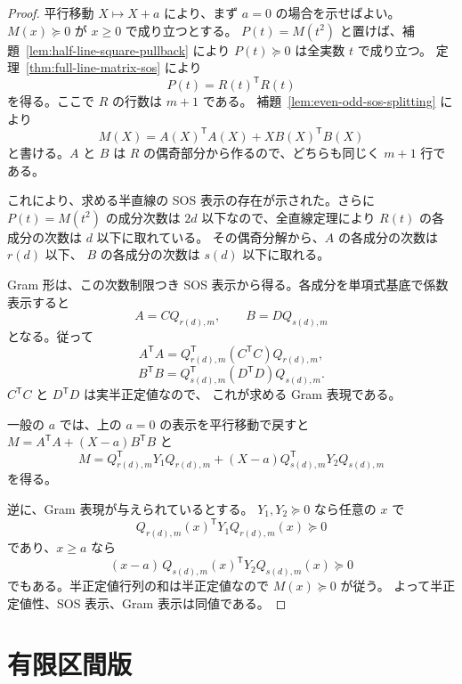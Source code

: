 \documentclass[uplatex,dvipdfmx]{jsarticle}
\newcommand{\psd}{\succeq 0}
\newcommand{\restateprefix}{}
\theoremstyle{matrixsosdefinition}
\begin{document}
\begin{proof}
  平行移動 \(X\mapsto X+a\) により、まず \(a=0\) の場合を示せばよい。
  \(M(x)\psd\) が \(x\ge0\) で成り立つとする。
  \(P(t)=M(t^2)\) と置けば、補題~\ref{lem:half-line-square-pullback} により
  \(P(t)\psd\) は全実数 \(t\) で成り立つ。
  定理~\ref{thm:full-line-matrix-sos} により
    \[
      P(t)=R(t)^{\mathsf T}R(t)
    \]
    を得る。ここで \(R\) の行数は \(m+1\) である。
    補題~\ref{lem:even-odd-sos-splitting} により
    \[
      M(X)=A(X)^{\mathsf T}A(X)+X B(X)^{\mathsf T}B(X)
    \]
    と書ける。\(A\) と \(B\) は \(R\) の偶奇部分から作るので、どちらも同じく
    \(m+1\) 行である。

  これにより、求める半直線の SOS 表示の存在が示された。さらに \(P(t)=M(t^2)\) の成分次数は
  \(2d\) 以下なので、全直線定理により \(R(t)\) の各成分の次数は \(d\) 以下に取れている。
  その偶奇分解から、\(A\) の各成分の次数は \(r(d)\) 以下、
  \(B\) の各成分の次数は \(s(d)\) 以下に取れる。

  Gram 形は、この次数制限つき SOS 表示から得る。各成分を単項式基底で係数表示すると
  \[
    A=CQ_{r(d),m},\qquad B=DQ_{s(d),m}
  \]
  となる。従って
  \[
    A^{\mathsf T}A
    =
    Q_{r(d),m}^{\mathsf T}(C^{\mathsf T}C)Q_{r(d),m},
  \]
  \[
    B^{\mathsf T}B
    =
    Q_{s(d),m}^{\mathsf T}(D^{\mathsf T}D)Q_{s(d),m}.
    \]
    \(C^{\mathsf T}C\) と \(D^{\mathsf T}D\) は実半正定値なので、
    これが求める Gram 表現である。

  一般の \(a\) では、上の \(a=0\) の表示を平行移動で戻すと
  \(M=A^{\mathsf T}A+(X-a)B^{\mathsf T}B\) と
  \[
    M=
    Q_{r(d),m}^{\mathsf T}Y_1Q_{r(d),m}
    +(X-a)Q_{s(d),m}^{\mathsf T}Y_2Q_{s(d),m}
  \]
  を得る。

  逆に、Gram 表現が与えられているとする。
  \(Y_1,Y_2\psd\) なら任意の \(x\) で
  \[
    Q_{r(d),m}(x)^{\mathsf T}Y_1Q_{r(d),m}(x)\psd
  \]
  であり、\(x\ge a\) なら
  \[
    (x-a)\,Q_{s(d),m}(x)^{\mathsf T}Y_2Q_{s(d),m}(x)\psd
  \]
  でもある。半正定値行列の和は半正定値なので \(M(x)\psd\) が従う。
  よって半正定値性、SOS 表示、Gram 表示は同値である。
\end{proof}

\section{有限区間版}

{\renewcommand{\restateprefix}{再掲; }\finiteIntervalMarkovLukacs*}
\end{document}
